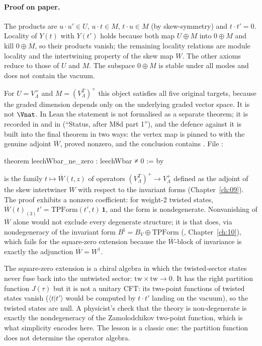\paragraph{Proof on paper.} The products are $u\cdot u'\in U$, $u\cdot t\in M$, $t\cdot u\in M$ (by
skew-symmetry) and $t\cdot t'=0$. Locality of $Y(t)$ with $Y(t')$ holds because both map $U\oplus M$
into $0\oplus M$ and kill $0\oplus M$, so their products vanish; the remaining locality relations
are module locality and the intertwining property of the skew map $W$. The other axioms reduce to
those of $U$ and $M$. The subspace $0\oplus M$ is stable under all modes and does not contain the
vacuum.

For $U=V_\Lambda^+$ and $M=(V_\Lambda^T)^+$ this object satisfies all five original targets,
because the graded dimension depends only on the underlying graded vector space. It is not $\Vnat$.
In Lean the statement is not formalised as a separate theorem; it is recorded in
 and in  (``Status, after M8d
part 1''), and the defence against it is built into the final theorem in two ways: the vertex map
is pinned to  with the genuine adjoint $\overline W$, proved nonzero, and
the conclusion contains . File :
\begin{leancode}
theorem leechWbar_ne_zero : leechWbar ≠ 0 := by
\end{leancode}

\begin{dictionary}
 is the family $t\mapsto\overline W(t,z)$ of operators $(V_\Lambda^T)^+\to V_\Lambda^+$
defined as the adjoint of the skew intertwiner $W$ with respect to the invariant forms
(Chapter~\ref{ch:09}). The proof exhibits a nonzero coefficient: for weight-2 twisted states,
$\overline W(t)_{(3)}t'=\mathrm{TPForm}(t',t)\,\mathbf 1$, and the form  is
nondegenerate. Nonvanishing of $\overline W$ alone would not exclude every degenerate structure; it is
 that does, via nondegeneracy of the invariant form $B^\natural=B_V\oplus\mathrm{TPForm}$
(, Chapter~\ref{ch:10}), which fails for the square-zero extension
because the $\overline W$-block of invariance is exactly the adjunction $\overline W=W^\dagger$.
\end{dictionary}

\begin{physics}
The square-zero extension is a chiral algebra in which the twisted-sector states never fuse
back into the untwisted sector: $\mathrm{tw}\times\mathrm{tw}\to 0$. It has the right partition
function $J(\tau)$ but it is not a unitary CFT: its two-point functions of twisted states vanish
($\langle t|t'\rangle$ would be computed by $t\cdot t'$ landing on the vacuum), so the twisted states
are null. A physicist's check that the theory is non-degenerate is exactly the nondegeneracy of the
Zamolodchikov two-point function, which is what simplicity encodes here. The lesson is a classic
one: the partition function does not determine the operator algebra.
\end{physics}

